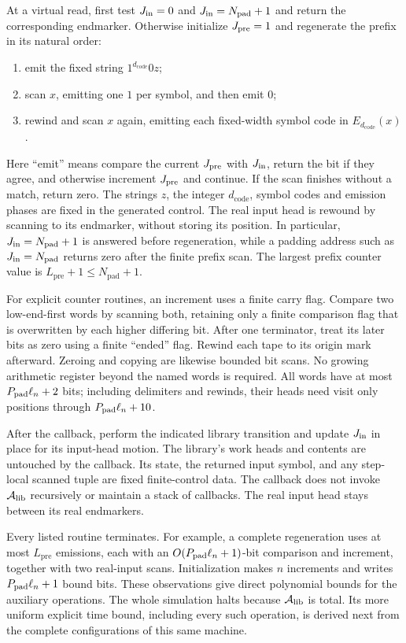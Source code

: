 At a virtual read, first test ${J_{\rm in}}=0$ and ${J_{\rm in}}=N_{\mathrm{pad}}+1$ and return
the corresponding endmarker.  Otherwise initialize ${J_{\rm pre}}=1$ and regenerate
the prefix in its natural order:
\begin{enumerate}
 \item emit the fixed string $1^{d_{\mathrm{code}}}0z$;
 \item scan $x$, emitting one $1$ per symbol, and then emit $0$;
 \item rewind and scan $x$ again, emitting each fixed-width symbol code
       in $E_{d_{\mathrm{code}}}(x)$.
\end{enumerate}
Here ``emit'' means compare the current ${J_{\rm pre}}$ with ${J_{\rm in}}$, return the bit
if they agree, and otherwise increment ${J_{\rm pre}}$ and continue.  If the scan
finishes without a match, return zero.  The strings $z$, the integer
$d_{\mathrm{code}}$, symbol codes and emission phases are fixed in
the generated control.  The real input head is rewound by scanning to
its endmarker, without storing its position.  In particular,
${J_{\rm in}}=N_{\mathrm{pad}}+1$ is answered before regeneration, while a padding
address such as ${J_{\rm in}}=N_{\mathrm{pad}}$ returns zero after the finite
prefix scan.  The largest prefix counter value is
$L_{\mathrm{pre}}+1\le N_{\mathrm{pad}}+1$.

For explicit counter routines, an increment uses a finite carry flag.
Compare two low-end-first words by scanning both, retaining only a
finite comparison flag that is overwritten by each higher differing
bit.  After one terminator, treat its later bits as zero using a finite
``ended'' flag.  Rewind each tape to its origin mark afterward.  Zeroing
and copying are likewise bounded bit scans.  No growing arithmetic
register beyond the named words is required.  All words have at most
$P_{\rm pad}\ell_n+2$ bits; including delimiters and rewinds, their heads need visit
only positions through $P_{\rm pad}\ell_n+10$.

After the callback, perform the indicated library transition and update
${J_{\rm in}}$ in place for its input-head motion.  The library's work heads and
contents are untouched by the callback.  Its state, the returned input
symbol, and any step-local scanned tuple are fixed finite-control data.
The callback does not invoke ${\mathcal A_{\rm lib}}$ recursively or maintain a stack of
callbacks.  The real input head stays between its real endmarkers.

Every listed routine terminates.  For example, a complete regeneration
uses at most $L_{\mathrm{pre}}$ emissions, each with an
$O(P_{\rm pad}\ell_n+1)$-bit comparison and increment, together with two real-input
scans.  Initialization makes $n$ increments and writes $P_{\rm pad}\ell_n+1$ bound
bits.  These observations give direct polynomial bounds for the
auxiliary operations.  The whole simulation halts because ${\mathcal A_{\rm lib}}$ is total.
Its more uniform explicit time bound, including every such operation,
is derived next from the complete configurations of this same machine.

